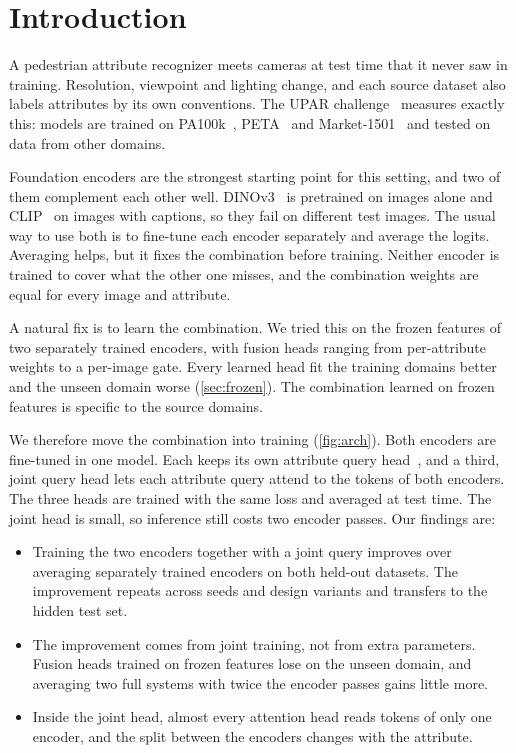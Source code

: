 \documentclass[10pt,twocolumn,letterpaper]{article}
\begin{document}
\section{Introduction}
\label{sec:intro}

A pedestrian attribute recognizer meets cameras at test time that it never saw in training. Resolution, viewpoint and lighting change, and each source dataset also labels attributes by its own conventions. The UPAR challenge~\cite{upar,upar24} measures exactly this: models are trained on PA100k~\cite{pa100k}, PETA~\cite{peta} and Market-1501~\cite{market,marketattr} and tested on data from other domains.

Foundation encoders are the strongest starting point for this setting, and two of them complement each other well. DINOv3~\cite{dinov3} is pretrained on images alone and CLIP~\cite{clip} on images with captions, so they fail on different test images. The usual way to use both is to fine-tune each encoder separately and average the logits. Averaging helps, but it fixes the combination before training. Neither encoder is trained to cover what the other one misses, and the combination weights are equal for every image and attribute.

A natural fix is to learn the combination. We tried this on the frozen features of two separately trained encoders, with fusion heads ranging from per-attribute weights to a per-image gate. Every learned head fit the training domains better and the unseen domain worse (\cref{sec:frozen}). The combination learned on frozen features is specific to the source domains.

We therefore move the combination into training (\cref{fig:arch}). Both encoders are fine-tuned in one model. Each keeps its own attribute query head~\cite{q2l,mldecoder}, and a third, joint query head lets each attribute query attend to the tokens of both encoders. The three heads are trained with the same loss and averaged at test time. The joint head is small, so inference still costs two encoder passes. Our findings are:
\begin{itemize}
\item Training the two encoders together with a joint query improves over averaging separately trained encoders on both held-out datasets. The improvement repeats across seeds and design variants and transfers to the hidden test set.
\item The improvement comes from joint training, not from extra parameters. Fusion heads trained on frozen features lose on the unseen domain, and averaging two full systems with twice the encoder passes gains little more.
\item Inside the joint head, almost every attention head reads tokens of only one encoder, and the split between the encoders changes with the attribute.
\end{itemize}
\end{document}
